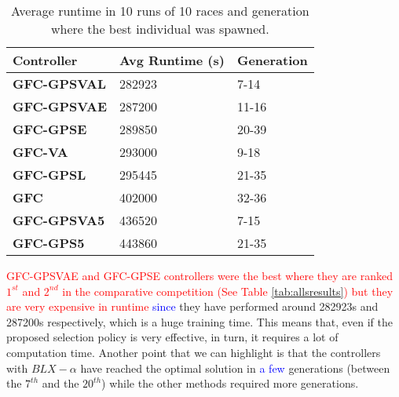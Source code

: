 \documentclass[10pt,journal,compsoc]{IEEEtran}
\begin{document}
\begin{table}[!ht]
	\centering
	{\scriptsize
          \caption{Average runtime in 10 runs of 10 races 
            and
                  generation where the best individual was spawned.}
		\label{tab:time}
		\begin{tabular}{|p{2.85cm}|p{2.20cm}|p{1.65cm}|}
			\hline  
			Controller& \textbf{Avg Runtime (s)}&\textbf{Generation}\\
\hline
\hline 	 
 \textbf{{\sf GFC-GPSVAL}} \cite{DBLP:conf/cig/SalemMG19}&282923
&7-14\\	
\textbf{{\sf GFC-GPSVAE}}&287200
&11-16\\
 \textbf{{\sf GFC-GPSE}}&289850
&20-39\\
\textbf{{\sf GFC-VA}} \cite{DBLP:conf/cig/SalemMG19}&293000
&9-18\\
 \textbf{{\sf GFC-GPSL}} \cite{DBLP:conf/cig/SalemMG19}&295445
&21-35\\
\textbf{\textbf{{\sf GFC}}} \cite{salem_cig2018}&402000
                   &32-36\\
\textbf{{\sf GFC-GPSVA5}} \cite{DBLP:conf/cig/SalemMG19}&436520
&7-15\\		
 \textbf{{\sf GFC-GPS5}} \cite{DBLP:conf/cig/SalemMG19}&443860
				&21-35\\	
					
			\hline 
		
		\end{tabular}
		
	}
\end{table} 
\textcolor{red}{{\sf GFC-GPSVAE} and {\sf GFC-GPSE} controllers were the best where
they are ranked $1^{st}$ and $2^{nd}$ in the comparative competition (See Table \ref{tab:allsresults}) but they are very expensive in runtime }\textcolor{blue}{ since} they have performed around 282923s and 287200s respectively, which is a
huge training time. %
This means that, even if the proposed selection policy is very effective, in turn, it requires a lot of computation time.
%
Another point that we can highlight is that the controllers with
$BLX-\alpha$ have reached the optimal solution in \textcolor{blue}{ a few}  generations
(between the $7^{th}$ and the $20^{th}$) while the other methods required more
generations. 
\end{document}
